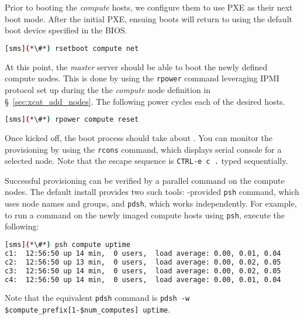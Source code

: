 Prior to booting the {\em compute} hosts, we configure them to use PXE as their
next boot mode. After the initial PXE, ensuing boots will return to using the default boot device
specified in the BIOS.

\begin{lstlisting}[language=bash,keywords={},upquote=true]
[sms](*\#*) rsetboot compute net
\end{lstlisting}

At this point, the {\em master} server should be able to boot the newly defined
compute nodes. This is done by using the \texttt{rpower} \xCAT{} command
leveraging IPMI protocol set up during the the {\em compute} node definition
in \S~\ref{sec:xcat_add_nodes}. The following power cycles each of the
desired hosts.


\begin{lstlisting}[language=bash,keywords={},upquote=true]
[sms](*\#*) rpower compute reset
\end{lstlisting}

Once kicked off, the boot process should take about .  You can monitor the
provisioning by using the \texttt{rcons} command, which displays serial console
for a selected node. Note that the escape sequence
is \texttt{CTRL-e c .} typed sequentially.

Successful provisioning can be verified by a parallel command on the compute
nodes. The default install provides two such tools: \xCAT{}-provided
\texttt{psh} command, which uses \xCAT{} node names and groups,
and \texttt{pdsh}, which works independently.  For example, to run a command on
the newly imaged compute hosts using \texttt{psh}, execute the following:

\begin{lstlisting}[language=bash]
[sms](*\#*) psh compute uptime
c1:  12:56:50 up 14 min,  0 users,  load average: 0.00, 0.01, 0.04
c2:  12:56:50 up 13 min,  0 users,  load average: 0.00, 0.02, 0.05
c3:  12:56:50 up 14 min,  0 users,  load average: 0.00, 0.02, 0.05
c4:  12:56:50 up 14 min,  0 users,  load average: 0.00, 0.01, 0.04
\end{lstlisting}
Note that the equivalent \texttt{pdsh} command is
\texttt{pdsh -w \${compute\_prefix}[1-\${num\_computes}] uptime}.
